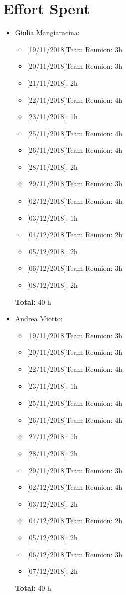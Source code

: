 \chapter{Effort Spent}

\begin{itemize}
\item Giulia Mangiaracina: 
\begin{itemize}
    \item {[}19/11/2018{]}Team Reunion: 3h
    \item {[}20/11/2018{]}Team Reunion: 3h
    \item {[}21/11/2018{]}: 2h
    \item {[}22/11/2018{]}Team Reunion: 4h
    \item {[}23/11/2018{]}: 1h
    \item {[}25/11/2018{]}Team Reunion: 4h
    \item {[}26/11/2018{]}Team Reunion: 4h
    \item {[}28/11/2018{]}: 2h
    \item {[}29/11/2018{]}Team Reunion: 3h
    \item {[}02/12/2018{]}Team Reunion: 4h
    \item {[}03/12/2018{]}: 1h
    \item {[}04/12/2018{]}Team Reunion: 2h
    \item {[}05/12/2018{]}: 2h
    \item {[}06/12/2018{]}Team Reunion: 3h
    \item {[}08/12/2018{]}: 2h
\end{itemize}
\textbf{Total:} 40 h

\item Andrea Miotto: 
\begin{itemize}
     \item {[}19/11/2018{]}Team Reunion: 3h
    \item {[}20/11/2018{]}Team Reunion: 3h
    \item {[}22/11/2018{]}Team Reunion: 4h
    \item {[}23/11/2018{]}: 1h
    \item {[}25/11/2018{]}Team Reunion: 4h
    \item {[}26/11/2018{]}Team Reunion: 4h
    \item {[}27/11/2018{]}: 1h
    \item {[}28/11/2018{]}: 2h
    \item {[}29/11/2018{]}Team Reunion: 3h
    \item {[}02/12/2018{]}Team Reunion: 4h
    \item {[}03/12/2018{]}: 2h
    \item {[}04/12/2018{]}Team Reunion: 2h
    \item {[}05/12/2018{]}: 2h
    \item {[}06/12/2018{]}Team Reunion: 3h
    \item {[}07/12/2018{]}: 2h
\end{itemize}
\textbf{Total:} 40 h


\end{itemize}

